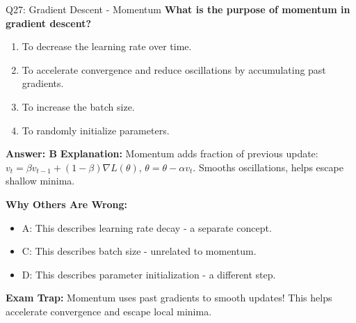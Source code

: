 \documentclass[8pt]{beamer}
\begin{document}
	\begin{frame}{Q27: Gradient Descent - Momentum}
		\fontsize{6.5}{7.5}\selectfont
		\textbf{What is the purpose of momentum in gradient descent?}
		
		\begin{enumerate}
			\item To decrease the learning rate over time.
			\item To accelerate convergence and reduce oscillations by accumulating past gradients.
			\item To increase the batch size.
			\item To randomly initialize parameters.
		\end{enumerate}
		
		\vspace{0.05cm}
		\textcolor{myblue}{\textbf{Answer: B}}
		\vspace{0.05cm}
		\textcolor{myblue}{\textbf{Explanation:}} Momentum adds fraction of previous update: $v_t = \beta v_{t-1} + (1-\beta)\nabla L(\theta)$, $\theta = \theta - \alpha v_t$. Smooths oscillations, helps escape shallow minima.
		
		\vspace{0.05cm}
		\textcolor{myred}{\textbf{Why Others Are Wrong:}}
		\begin{itemize}
			\item \textcolor{myred}{A:} This describes learning rate decay - a separate concept.
			\item \textcolor{myred}{C:} This describes batch size - unrelated to momentum.
			\item \textcolor{myred}{D:} This describes parameter initialization - a different step.
		\end{itemize}
		
		\textcolor{myred}{\textbf{Exam Trap:}} Momentum uses \textcolor{myblue}{past gradients} to smooth updates! This helps accelerate convergence and escape local minima.
	\end{frame}
	
\end{document}
